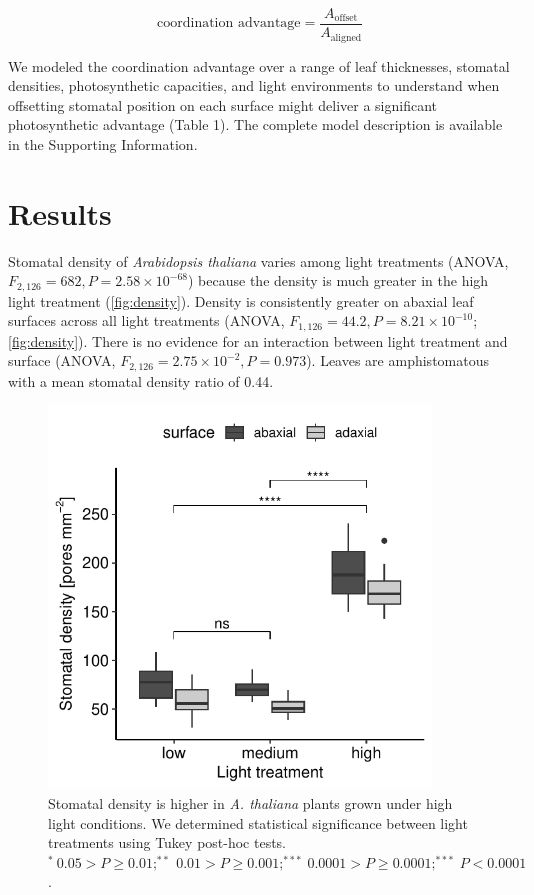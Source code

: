 \documentclass[webpdf,large,modern,unnumsec,namedate]{oup-authoring-template}
\begin{document}
\begin{equation} \label{eq:coordination_advantage}
  \text{coordination advantage} = \frac{A_\text{offset}}{A_\text{aligned}}
\end{equation}

We modeled the coordination advantage over a range of leaf thicknesses,
stomatal densities, photosynthetic capacities, and light environments to
understand when offsetting stomatal position on each surface might
deliver a significant photosynthetic advantage (Table 1). The complete
model description is available in the Supporting Information.

\section{Results}\label{results}

Stomatal density of \emph{Arabidopsis thaliana} varies among light
treatments (ANOVA, \(F_{2,126} = 682, P = 2.58 \times 10^{-68}\))
because the density is much greater in the high light treatment
(\autoref{fig:density}). Density is consistently greater on abaxial leaf
surfaces across all light treatments (ANOVA,
\(F_{1,126} = 44.2, P = 8.21 \times 10^{-10}\); \autoref{fig:density}).
There is no evidence for an interaction between light treatment and
surface (ANOVA, \(F_{2,126} = 2.75 \times 10^{-2}, P = 0.973\)). Leaves
are amphistomatous with a mean stomatal density ratio of 0.44.

\begin{figure}[ht]
\includegraphics[width = 4in]{figures/density.pdf}
\caption{Stomatal density is higher in \textit{A. thaliana} plants grown under high light conditions. We determined statistical significance between light treatments using Tukey post-hoc tests. $^*~0.05 > P \ge 0.01; ^{**}~0.01 > P \ge 0.001; ^{***}~0.0001 > P \ge 0.0001; ^{***}~ P <0.0001$.}
\label{fig:density}
\end{figure}
\end{document}
